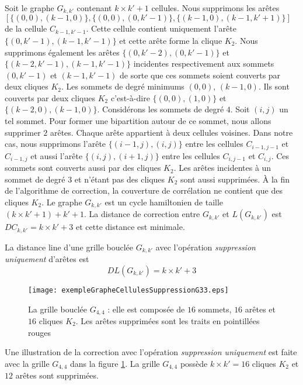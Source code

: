 \label{modificationSuppressionAretesUniquement}
Soit le graphe $G_{k,k'}$ contenant $k \times k' + 1$ cellules.
Nous supprimons les ar\^etes \\ $[\{(0,0),(k-1,0) \},  \{(0,0),(0, k'-1) \}, \{(k-1,0),(k-1,k'+1) \}]$ de la  cellule $C_{k-1,k'-1}$. Cette cellule contient uniquement  l'ar\^ete $\{(0,k'-1),(k-1,k'-1) \}$ et cette ar\^ete forme la clique $K_2$.
Nous supprimons \'egalement les ar\^etes $\{(0,k'-2),(0,k'-1)\}$ et $\{(k-2,k'-1),(k-1,k'-1) \}$  incidentes respectivement aux sommets $(0,k'-1)$ et $(k-1,k'-1)$ de sorte que ces sommets soient couverts par deux cliques $K_2$.
Les sommets de degr\'e minimums $(0,0)$, $(k-1,0)$. Ils sont couverts par deux cliques $K_2$ c'est-\`a-dire $\{(0,0),(1,0)\}$ et $\{(k-2,0) ,(k-1,0)\}$.
\newline
Consid\'erons les sommets de degr\'e $4$. Soit $(i,j)$ un tel sommet.
Pour former une bipartition autour de ce sommet, nous allons supprimer $2$ ar\^etes. Chaque ar\^ete appartient \`a deux cellules voisines. Dans notre cas, nous supprimons l'ar\^ete $\{(i-1, j), (i,j)\}$ entre les cellules $C_{i-1,j-1}$ et $C_{i-1,j}$ et aussi l'ar\^ete $\{(i,j), (i+1,j)\}$ entre les cellules $C_{i,j-1}$ et $C_{i,j}$. Ces sommets sont couverts aussi par des cliques $K_2$.
\newline
Les ar\^etes incidentes \`a un sommet de degr\'e $3$ et n'\'etant pas des cliques $K_2$ sont aussi supprim\'ees.
\newline
\`A la fin de l'algorithme de correction, la couverture de corr\'elation ne contient que des cliques $K_2$.
Le graphe $G_{k,k'}$ est un cycle hamiltonien de taille $(k \times k'+1) + k' + 1$.
La distance de correction entre $G_{k,k'}$ et $L(G_{k,k'})$ est $DC_{k,k'} = k \times k' +3 $ et cette distance est minimale.

\begin{lemma}
La distance line  d'une grille boucl\'ee $G_{k,k'}$ avec l'op\'eration {\em suppression uniquement} d'ar\^etes est 
\begin{equation}
\label{borneSuperieureDL}
DL(G_{k,k'}) = k \times k' +3 
\end{equation}
\end{lemma}

\begin{figure}[htb!] 
\centering
\texttt{[image: exempleGrapheCellulesSuppressionG33.eps]}
\caption{ La grille boucl\'ee $G_{4,4}$ : elle est compos\'ee de $16$ sommets, $16$ ar\^etes et $16$ cliques $K_2$. Les ar\^etes supprim\'ees sont les traits en pointill\'ees rouges }
\label{exempleCorrectionGrapheCelluleAvecSuppression}
\end{figure}
Une illustration de la correction avec l'op\'eration {\em suppression uniquement} est faite avec la grille $G_{4,4}$ dans la figure \ref{exempleCorrectionGrapheCelluleAvecSuppression}.
La grille $G_{4,4}$ poss\`ede $ k \times k' = 16$ cliques $K_2$ et $12$ ar\^etes sont supprim\'ees.
\newline

